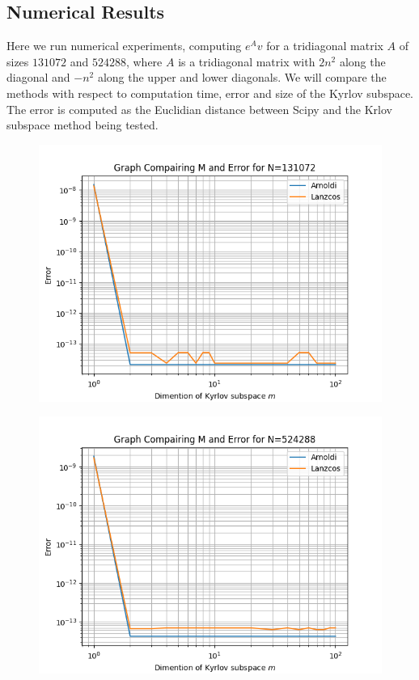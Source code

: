 \documentclass{article}
\begin{document}
\subsection{Numerical Results}
Here we run numerical experiments, computing $e^Av$ for a tridiagonal matrix $A$ of sizes $131072$ and $524288$, where $A$ is a tridiagonal matrix with $2n^2$ along the diagonal and $-n^2$ along the upper and lower diagonals. We will compare the methods with respect to computation time, error and size of the Kyrlov subspace. The error is computed as the Euclidian distance between Scipy and the Krlov subspace method being tested.

\begin{figure}[H]
    \centering
    \begin{minipage}{0.5\textwidth}
       \centering
	  \includegraphics[width=\linewidth]{Plots/M v E Results for N=131072.png}
	  \label{fig:MEe7}
    \end{minipage}\hfill
    \begin{minipage}{0.5\textwidth}
       \centering
	  \includegraphics[width=\linewidth]{Plots/M v E Results for N=524288.png}
	  \label{fig:MEe6}
    \end{minipage}
\end{figure}
\end{document}
